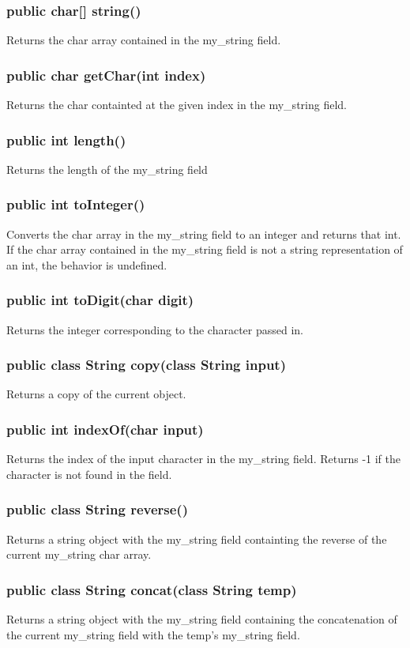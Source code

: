 \begin{homeworkProblem}
    \subsubsection{public char[] string()}
    Returns the char array contained in the my_string field.
    \subsubsection{public char getChar(int index)}
    Returns the char containted at the given index in the my_string field.
    \subsubsection{public int length()}
    Returns the length of the my_string field
    \subsubsection{public int toInteger()}
    Converts the char array in the my_string field to an integer and returns that int. If the char array contained in the my_string field is not a  string representation of an int, the behavior is undefined.
    \subsubsection{public int toDigit(char digit)}
    Returns the integer corresponding to the character passed in.
    \subsubsection{public class String copy(class String input)}
    Returns a copy of the current object.
    \subsubsection{public int indexOf(char input)}
    Returns the index of the input character in the my_string field. Returns -1 if the character is not found in the field.
    \subsubsection{public class String reverse()}
    Returns a string object with the my_string field containting the reverse of the current my_string char array.
    \subsubsection{public class String concat(class String temp)}
    Returns a string object with the my_string field containing the concatenation of the current my_string field with the temp's my_string field.

\end{homeworkProblem}
